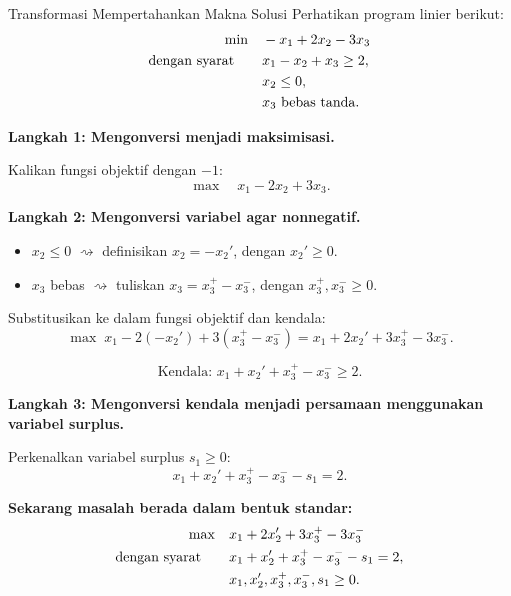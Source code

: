 \begin{example}{Transformasi Mempertahankan Makna Solusi}\label{exa:canonical-map-example}
Perhatikan program linier berikut:
\[
\begin{aligned}
\min \quad & -x_1 + 2x_2 - 3x_3 \\
\mbox{dengan syarat}\quad \quad
& x_1 - x_2 + x_3 \geq 2, \\
& x_2 \leq 0, \\
& x_3 \mbox{ bebas tanda}.
\end{aligned}
\]

\textbf{Langkah 1: Mengonversi menjadi maksimisasi.}

Kalikan fungsi objektif dengan \( -1 \):
\[
\max \quad x_1 - 2x_2 + 3x_3.
\]

\textbf{Langkah 2: Mengonversi variabel agar nonnegatif.}

\begin{itemize}
    \item \( x_2 \leq 0 \) \( \rightsquigarrow \) definisikan \( x_2 = -x_2' \), dengan \( x_2' \geq 0 \).
    \item \( x_3 \) bebas \( \rightsquigarrow \) tuliskan \( x_3 = x_3^+ - x_3^- \), dengan \( x_3^+, x_3^- \geq 0 \).
\end{itemize}

Substitusikan ke dalam fungsi objektif dan kendala:
\[
\max \; x_1 - 2(-x_2') + 3(x_3^+ - x_3^-) = x_1 + 2x_2' + 3x_3^+ - 3x_3^-.
\]

\[
\text{Kendala: } x_1 + x_2' + x_3^+ - x_3^- \geq 2.
\]

\textbf{Langkah 3: Mengonversi kendala menjadi persamaan menggunakan variabel surplus.}

Perkenalkan variabel surplus \( s_1 \geq 0 \):
\[
x_1 + x_2' + x_3^+ - x_3^- - s_1 = 2.
\]

\textbf{Sekarang masalah berada dalam bentuk standar:}
\[
\begin{aligned}
\max \quad & x_1 + 2x_2' + 3x_3^+ - 3x_3^- \\
\mbox{dengan syarat}\quad \quad & x_1 + x_2' + x_3^+ - x_3^- - s_1 = 2, \\
& x_1, x_2', x_3^+, x_3^-, s_1 \geq 0.
\end{aligned}
\]
\end{example}

